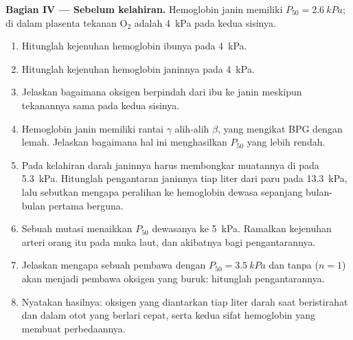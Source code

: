 \begin{problem}
\medskip
\noindent\textbf{Bagian IV --- Sebelum kelahiran.}
Hemoglobin janin memiliki $P_{50} = \qty{2.6}{kPa}$; di dalam plasenta
tekanan $\mathrm{O_2}$ adalah \qty{4}{kPa} pada kedua sisinya.
\begin{enumerate}[resume]
  \item Hitunglah kejenuhan hemoglobin ibunya pada \qty{4}{kPa}.
  \item Hitunglah kejenuhan hemoglobin janinnya pada \qty{4}{kPa}.
  \item Jelaskan bagaimana oksigen berpindah dari ibu ke janin meskipun
        tekanannya sama pada kedua sisinya.
  \item Hemoglobin janin memiliki rantai $\gamma$ alih-alih $\beta$,
        yang mengikat BPG dengan lemah. Jelaskan bagaimana hal ini
        menghasilkan $P_{50}$ yang lebih rendah.
  \item Pada kelahiran darah janinnya harus membongkar muatannya di
         pada \qty{5.3}{kPa}. Hitunglah pengantaran janinnya
        tiap liter dari paru pada \qty{13.3}{kPa}, lalu sebutkan
        mengapa peralihan ke hemoglobin dewasa sepanjang bulan-bulan
        pertama berguna.
  \item Sebuah mutasi menaikkan $P_{50}$ dewasanya ke \qty{5}{kPa}.
        Ramalkan kejenuhan arteri orang itu pada muka laut, dan
        akibatnya bagi pengantarannya.
  \item Jelaskan mengapa sebuah pembawa dengan $P_{50} = \qty{3.5}{kPa}$
        dan tanpa  ($n = 1$) akan menjadi pembawa oksigen yang
        buruk: hitunglah pengantarannya.
  \item Nyatakan hasilnya: oksigen yang diantarkan tiap liter darah saat
        beristirahat dan dalam otot yang berlari cepat, serta kedua
        sifat hemoglobin yang membuat perbedaannya.
\end{enumerate}
\end{problem}
